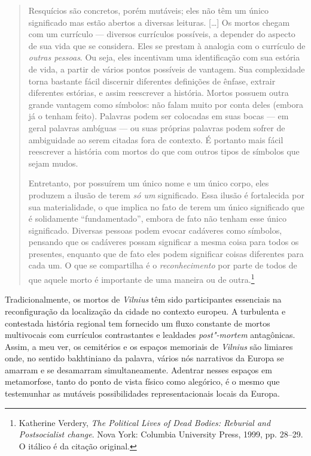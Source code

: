 \begin{quote}
Resquícios são concretos, porém mutáveis; eles não têm um único
significado mas estão abertos a diversas leituras. [\ldots{}] Os mortos chegam
com um currículo --- diversos currículos possíveis, a depender do aspecto
de sua vida que se considera. Eles se prestam à analogia com o currículo
de \textit{outras pessoas}. Ou seja, eles incentivam uma identificação com
sua estória de vida, a partir de vários pontos possíveis de vantagem.
Sua complexidade torna bastante fácil discernir diferentes definições de
ênfase, extrair diferentes estórias, e assim reescrever a história.
Mortos possuem outra grande vantagem como símbolos: não falam muito por
conta deles (embora já o tenham feito). Palavras podem ser colocadas em
suas bocas --- em geral palavras ambíguas --- ou suas próprias palavras
podem sofrer de ambiguidade ao serem citadas fora de contexto. É
portanto mais fácil reescrever a história com mortos do que com outros
tipos de símbolos que sejam mudos.

Entretanto, por possuírem um único nome e um único corpo, eles produzem
a ilusão de terem \textit{só um} significado. Essa ilusão é fortalecida
por sua materialidade, o que implica no fato de terem um único
significado que é solidamente ``fundamentado'', embora de fato não
tenham esse único significado. Diversas pessoas podem evocar cadáveres
como símbolos, pensando que os cadáveres possam significar a mesma coisa
para todos os presentes, enquanto que de fato eles podem significar
coisas diferentes para cada um. O que se compartilha é o
\textit{reconhecimento} por parte de todos de que aquele morto é
importante de uma maneira ou de outra.\footnote{Katherine Verdery, \textit{The Political Lives of Dead Bodies: Reburial and Postsocialist change}. Nova York: Columbia University Press, 1999, pp. 28--29. O itálico é da citação original.} 
\end{quote}

Tradicionalmente, os mortos de \textit{Vilnius} têm sido participantes essenciais
na reconfiguração da localização da cidade no contexto europeu. A
turbulenta e contestada história regional tem fornecido um fluxo
constante de mortos multivocais com currículos contrastantes e lealdades
\textit{post"-mortem} antagônicas. Assim, a meu ver, os cemitérios e os
espaços memoriais de \textit{Vilnius} são limiares onde, no sentido bakhtiniano
da palavra, vários nós narrativos da Europa se amarram e se desamarram
simultaneamente. Adentrar nesses espaços em metamorfose, tanto do ponto
de vista físico como alegórico, é o mesmo que testemunhar as mutáveis
possibilidades representacionais locais da Europa.

